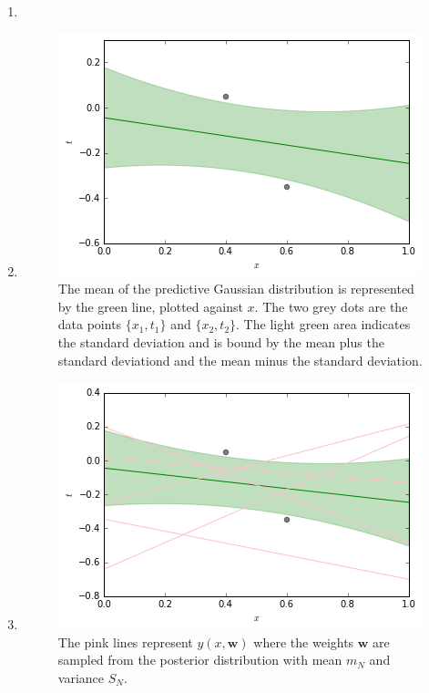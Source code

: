 \documentclass[a4paper,10pt]{article}
\numberwithin{equation}{section} %
\numberwithin{figure}{section} %
\numberwithin{table}{section} %
\theoremstyle{mytheor}
\begin{document}
\begin{enumerate}
	\item 
	\item \begin{figure}[h!]
   			\centering
   			\includegraphics{exercise1plottanopink.png}\vspace{-0.4cm}
   			\caption{\vspace{-0.1cm} The mean of the predictive Gaussian distribution is represented by the green line, plotted against $x$. \vspace{-0.1cm}The two grey dots are the data points $\{x_1,t_1\}$ and $\{x_2,t_2\}$. The light green area indicates the standard deviation and is bound by the mean plus the standard deviationd and the mean minus the standard deviation.}\vspace{-0.2cm}
  		\end{figure}
	\item \begin{figure}[h!]
   			\centering
   			\includegraphics{exercise1plotta.png}\vspace{-0.4cm}
   			\caption{\vspace{-0.0cm} The pink lines represent $y(x,\boldsymbol{w})$ where the weights $\boldsymbol{w}$ are sampled from the posterior distribution with mean $m_N$ and variance $S_N$.}
  		\end{figure}
\end{enumerate}
\end{document}
